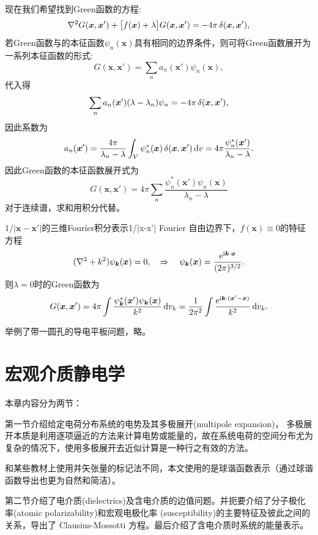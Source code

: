 现在我们希望找到Green函数的方程:
\begin{equation}
    \nabla^2 G(\bm x,\bm x')+\bigl[f(\bm x)+\lambda\bigr]G(\bm x,\bm x')=-4\pi\mathop{}\!\delta(\bm x,\bm x'),
\end{equation}
若Green函数与的本征函数$\psi_n(\bm x)$具有相同的边界条件，则可将Green函数展开为一系列本征函数的形式:
\[
    G(\bm x,\bm x')=\sum_n a_n(\bm x')\psi_n(\bm x),
\]
代入得
\[
    \sum_n a_n(\bm x')(\lambda-\lambda_n)\psi_n=-4\pi\mathop{}\!\delta(\bm x,\bm x'),
\]
因此系数为
\[
    a_n(\bm x')=\frac{4\pi}{\lambda_n-\lambda}\int_V\psi^\ast_n(\bm x)\mathop{}\!\delta(\bm x,\bm x')\mathop{}\!\mathrm{d} v=4\pi\frac{\psi_n^\ast(\bm x')}{\lambda_n-\lambda}.
\]
因此Green函数的本征函数展开式为
\begin{equation}
    G(\bm x,\bm x')=4\pi\sum_n \frac{\psi_n^\ast(\bm x')\psi_n(\bm x)}{\lambda_n-\lambda}
\end{equation}
对于连续谱，求和用积分代替。
\begin{example}{$1/|\bm x-\bm x'|$的三维Fourier积分表示}{1/|x-x'| Fourier}
    自由边界下，$f(\bm x)\equiv 0$的特征方程
    \[
        (\nabla^2+k^2)\psi_{\bm k}(\bm x)=0,\quad\Rightarrow\quad\psi_{\bm k}(\bm x)=\frac{\mathop{}\!\mathrm{e}^{\mathrm{i}\bm k\cdot\bm x}}{(2\pi)^{3/2}}.
    \]
    则$\lambda=0$时的Green函数为
    \[
        G(\bm x,\bm x')=4\pi\int\frac{\psi_{\bm k}^\ast(\bm x')\psi_{\bm k}(\bm x)}{k^2}\mathop{}\!\mathrm{d} v_k=\frac1{2\pi^2}\int\frac{\mathop{}\!\mathrm{e}^{\mathrm{i}\bm k\cdot(\bm x'-\bm x)}}{k^2}\mathop{}\!\mathrm{d} v_k.
    \]
\end{example}

举例了带一圆孔的导电平板问题，略。
\clearpage
\section{宏观介质静电学}
\label{sec:electrostatics of macroscopic media}
本章内容分为两节：
\begin{compactenum}
    \item 第一节介绍给定电荷分布系统的电势及其多极展开(multipole expansion)，%
    多极展开本质是利用逐项逼近的方法来计算电势或能量的，故在系统电荷的空间分布尤为复杂的情况下，使用多极展开去近似计算是一种行之有效的方法。
    
    和某些教材上使用并矢张量的标记法不同，本文使用的是球谐函数表示（通过球谐函数导出也更为自然和简洁）。

    \item 第二节介绍了电介质(dielectrics)及含电介质的边值问题。并扼要介绍了分子极化率(atomic polarizability)和宏观电极化率 (susceptibility)的主要特征及彼此之间的关系，导出了 Clausius-Mossotti 方程。最后介绍了含电介质时系统的能量表示。
\end{compactenum}
